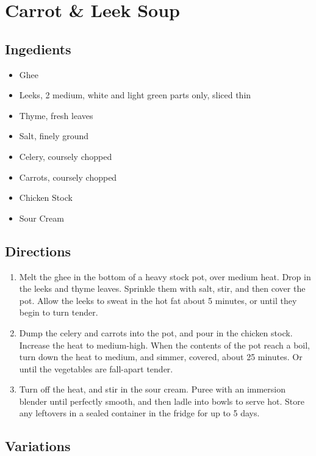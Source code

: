 \section{Carrot \& Leek Soup}

\subsection{ Ingedients }

\begin{itemize}
  \item <2 tbs> Ghee
  \item <12 oz> Leeks, 2 medium, white and light green parts only, sliced thin 
  \item <2 tsp> Thyme, fresh leaves
  \item <2 tsp> Salt, finely ground
  \item <4 ribs> Celery, coursely chopped
  \item <2 lbs> Carrots, coursely chopped
  \item <5 cups> Chicken Stock
  \item <1 cup> Sour Cream
\end{itemize}

\subsection{ Directions }

\begin{enumerate}
  \item Melt the ghee in the bottom of a heavy stock pot, over medium heat. Drop in the leeks and thyme leaves. Sprinkle them with salt, stir, and then cover the pot. Allow the leeks to sweat in the hot fat about 5 minutes, or until they begin to turn tender.
  \item Dump the celery and carrots into the pot, and pour in the chicken stock. Increase the heat to medium-high. When the contents of the pot reach a boil, turn down the heat to medium, and simmer, covered, about 25 minutes. Or until the vegetables are fall-apart tender. 
  \item Turn off the heat, and stir in the sour cream. Puree with an immersion blender until perfectly smooth, and then ladle into bowls to serve hot. Store any leftovers in a sealed container in the fridge for up to 5 days. 
\end{enumerate}

\subsection{ Variations }
